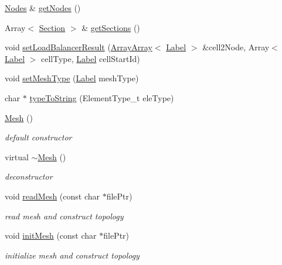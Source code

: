 \begin{DoxyCompactItemize}
\hyperlink{classHSF_1_1Nodes}{Nodes} \& \hyperlink{classHSF_1_1Mesh_aef198f95314eb6938a1713b07337155f}{getNodes} ()
\item 
Array$<$ \hyperlink{classHSF_1_1Section}{Section} $>$ \& \hyperlink{classHSF_1_1Mesh_a4c3c5c8a8ccd5413c01c05592863a5ea}{getSections} ()
\item 
void \hyperlink{classHSF_1_1Mesh_aef90381f0de5a072b710906f955717fd}{setLoadBalancerResult} (\hyperlink{classHSF_1_1ArrayArray}{ArrayArray}$<$ \hyperlink{namespaceHSF_ae65d72be782e989396ebe5ec6ae4c2b6}{Label} $>$ \&cell2Node, Array$<$ \hyperlink{namespaceHSF_ae65d72be782e989396ebe5ec6ae4c2b6}{Label} $>$ cellType, \hyperlink{namespaceHSF_ae65d72be782e989396ebe5ec6ae4c2b6}{Label} cellStartId)
\item 
void \hyperlink{classHSF_1_1Mesh_a00a74cf612e08f90f88ada5c33a2a802}{setMeshType} (\hyperlink{namespaceHSF_ae65d72be782e989396ebe5ec6ae4c2b6}{Label} meshType)
\item 
char $\ast$ \hyperlink{classHSF_1_1Mesh_a39999f4b36df55778f07f6696985052f}{typeToString} (ElementType\_\-t eleType)
\item 
\hyperlink{classHSF_1_1Mesh_acbd942f68387a832b8f7d5927db54eea}{Mesh} ()
\begin{DoxyCompactList}\small\item\em default constructor \item\end{DoxyCompactList}\item 
virtual \hyperlink{classHSF_1_1Mesh_a3920b19d7969a8bb5d1eb505ec9f43b4}{$\sim$Mesh} ()
\begin{DoxyCompactList}\small\item\em deconstructor \item\end{DoxyCompactList}\item 
void \hyperlink{classHSF_1_1Mesh_aa9073cb283b0b0be1a6131fc14fbabf3}{readMesh} (const char $\ast$filePtr)
\begin{DoxyCompactList}\small\item\em read mesh and construct topology \item\end{DoxyCompactList}\item 
void \hyperlink{classHSF_1_1Mesh_aeadaa406bc94ca79dbac39b69f0929a2}{initMesh} (const char $\ast$filePtr)
\begin{DoxyCompactList}\small\item\em initialize mesh and construct topology \item\end{DoxyCompactList}\item 

\end{DoxyCompactItemize}
